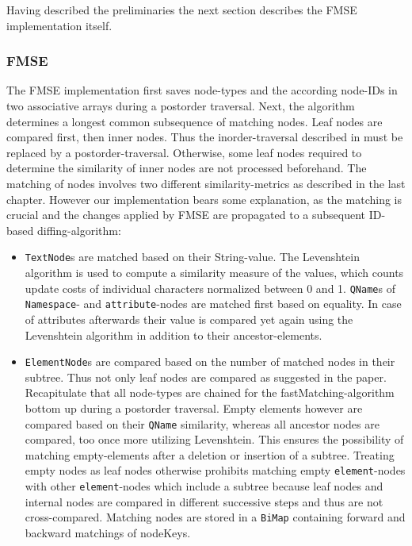 Having described the preliminaries the next section describes the FMSE implementation itself.

\subsubsection{FMSE} The FMSE implementation first saves node-types and the according node-IDs in two associative arrays during a postorder traversal. Next, the algorithm determines a longest common subsequence of matching nodes. Leaf nodes are compared first, then inner nodes. Thus the inorder-traversal described in \cite{chawathe1996change} must be replaced by a postorder-traversal. Otherwise, some leaf nodes required to determine the similarity of inner nodes are not processed beforehand. The matching of nodes involves two different similarity-metrics as described in the last chapter. However our implementation bears some explanation, as the matching is crucial and the changes applied by FMSE are propagated to a subsequent ID-based diffing-algorithm:

\begin{itemize}
\item \texttt{TextNode}s are matched based on their String-value. The Levenshtein algo\-rithm is used to compute a similarity measure of the values, which counts update costs of individual characters normalized between 0 and 1. \texttt{QName}s of \texttt{Namespace}- and \texttt{attribute}-nodes are matched first based on equality. In case of attributes afterwards their value is compared yet again using the Levenshtein algorithm in addition to their ancestor-elements.

\item \texttt{ElementNode}s are compared based on the number of matched nodes in their subtree. Thus not only leaf nodes are compared as suggested in the paper. Recapitulate that all node-types are chained for the fast\-Matching-algorithm bottom up during a postorder traversal. Empty elements however are compared based on their \texttt{QName} similarity, whereas all ancestor nodes are compared, too once more utilizing Levenshtein. This ensures the possibility of matching empty-elements after a deletion or insertion of a subtree. Treating empty nodes as leaf nodes otherwise prohibits matching empty \texttt{element}-nodes with other \texttt{element}-nodes which include a subtree because leaf nodes and internal nodes are compared in different successive steps and thus are not cross-compared. Matching nodes are stored in a \texttt{BiMap} containing forward and backward matchings of nodeKeys.
\end{itemize}

